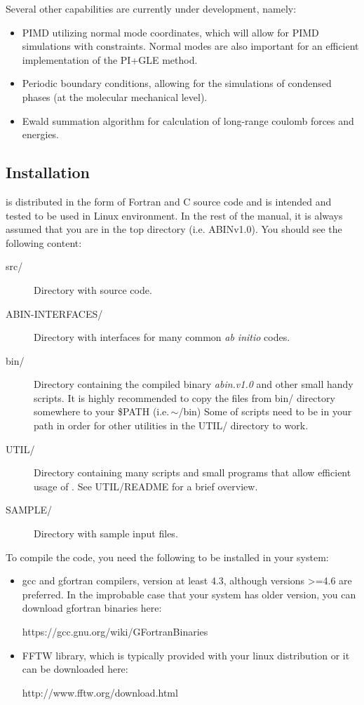 \documentclass[12pt,a4paper]{article}
\begin{document}
Several other capabilities are currently under development, namely:
\begin{itemize}
\item PIMD utilizing normal mode coordinates, which will allow for PIMD simulations with constraints.
Normal modes are also important for an efficient implementation of the PI+GLE method.
\item Periodic boundary conditions, allowing for the simulations of condensed phases (at the molecular mechanical level).
\item Ewald summation algorithm for calculation of long-range coulomb forces and energies.
\end{itemize}

\subsection{Installation}
\abin is distributed in the form of Fortran and C source code and is intended and tested to be used in Linux environment.
In the rest of the manual, it is always assumed that you are in the top \abin directory (i.e. ABINv1.0). You should see the following content:
\begin{description}
\item[src/] Directory with source code.

\item[ABIN-INTERFACES/] Directory with interfaces for many common \textit{ab initio} codes.

\item[bin/] Directory containing the compiled binary \textit{abin.v1.0} and other small handy scripts. It is highly recommended to copy the files from bin/ directory somewhere to your  \$PATH (i.e.\,$\sim$/bin) Some of scripts need to be in your path in order for other utilities in the UTIL/ directory to work.

\item[UTIL/] Directory containing many scripts and small programs that allow efficient usage of \abin. See UTIL/README for a brief overview.

\item[SAMPLE/] Directory with sample input files.
\end{description}

To compile the code, you need the following to be installed in your system:
\begin{itemize}
\item gcc and gfortran compilers, version at least 4.3, although versions >=4.6 are preferred.
In the improbable case that your system has older version, you can download gfortran binaries here:

https://gcc.gnu.org/wiki/GFortranBinaries

\item FFTW library, which is typically provided with your linux distribution or it can be downloaded here:

http://www.fftw.org/download.html 

\end{itemize}
\end{document}
